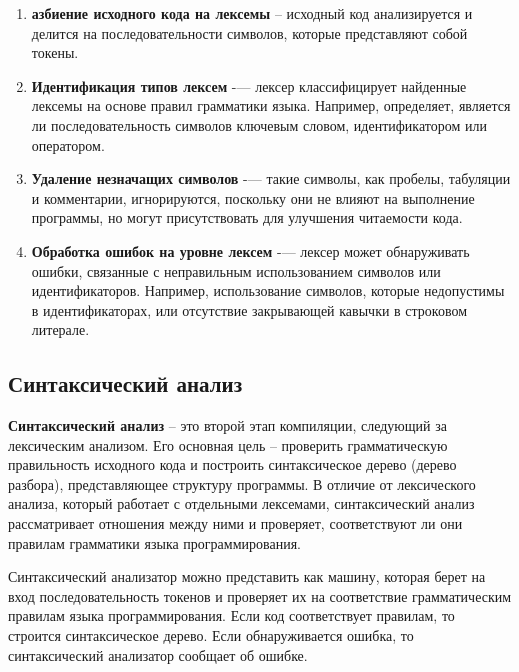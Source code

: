 \begin{enumerate}
  \item \textbf{азбиение исходного кода на лексемы} -- исходный код анализируется и делится на последовательности символов, которые представляют собой токены.
  \item \textbf{Идентификация типов лексем} -— лексер классифицирует найденные лексемы на основе правил грамматики языка. Например, определяет, является ли последовательность символов ключевым словом, идентификатором или оператором.
  \item \textbf{Удаление незначащих символов} -— такие символы, как пробелы, табуляции и комментарии, игнорируются, поскольку они не влияют на выполнение программы, но могут присутствовать для улучшения читаемости кода.
  \item \textbf{Обработка ошибок на уровне лексем} -— лексер может обнаруживать ошибки, связанные с неправильным использованием символов или идентификаторов. Например, использование символов, которые недопустимы в идентификаторах, или отсутствие закрывающей кавычки в строковом литерале.
\end{enumerate}


\subsection{Синтаксический анализ}

\textbf{Синтаксический анализ} \cite{syntax-analyzer} -- это второй этап компиляции, следующий за лексическим анализом. Его основная цель -- проверить грамматическую правильность исходного кода и построить синтаксическое дерево (дерево разбора), представляющее структуру программы. В отличие от лексического анализа, который работает с отдельными лексемами, синтаксический анализ рассматривает отношения между ними и проверяет, соответствуют ли они правилам грамматики языка программирования.

Синтаксический анализатор можно представить как машину, которая берет на вход последовательность токенов и проверяет их на соответствие грамматическим правилам языка программирования. Если код соответствует правилам, то строится синтаксическое дерево. Если обнаруживается ошибка, то синтаксический анализатор сообщает об ошибке.

